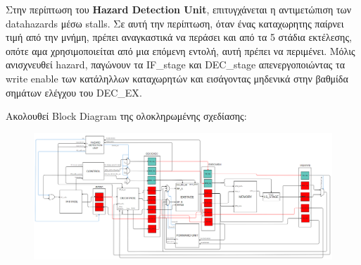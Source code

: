 \begin{justify}
    Στην περίπτωση του {\bf \textlatin{Hazard Detection Unit}},
    επιτυγχάνεται η αντιμετώπιση των \textlatin{datahazards}
    μέσω \textlatin{stalls}. Σε αυτή την περίπτωση, όταν
    ένας καταχωρητης παίρνει τιμή από την μνήμη,
    πρέπει αναγκαστικά να περάσει και από τα 5 στάδια εκτέλεσης,
    οπότε αμα χρησιμοποιείται από μια επόμενη εντολή, αυτή
    πρέπει να περιμένει. Μόλις ανισχνευθεί \textlatin{hazard},
    παγώνουν τα \textlatin{IF\_stage} και \textlatin{DEC\_stage}
    απενεργοποιώντας τα \textlatin{write enable} των κατάληλλων
    καταχωρητών και εισάγοντας μηδενικά στην βαθμίδα σημάτων
    ελέγχου του \textlatin{DEC\_EX}.
\end{justify}


\newpage

\begin{justify}
    Ακολουθεί \textlatin{Block Diagram} της ολοκληρωμένης σχεδίασης:
\end{justify}


\begin{figure}[h]
    \raggedright
    \hspace{-1cm}
    \includegraphics[width=1.1\textwidth]{IMAGES/BLOCK_DIAGRAM.png} %
\end{figure}